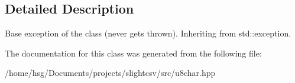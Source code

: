 \subsection{Detailed Description}
Base exception of the class (never gets thrown). Inheriting from std\+::exception. 

The documentation for this class was generated from the following file\+:\begin{DoxyCompactItemize}
\item 
/home/hsg/\+Documents/projects/slightcsv/src/u8char.\+hpp\end{DoxyCompactItemize}
